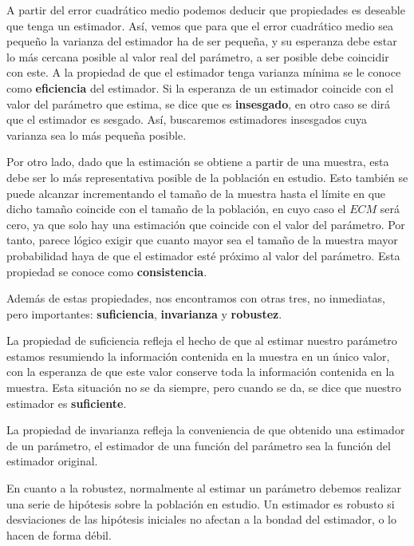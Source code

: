 A partir del error cuadr\'atico medio podemos deducir que propiedades es deseable que tenga un estimador. As\'i, vemos que para que el error cuadr\'atico medio sea peque\~no la varianza del estimador ha de ser peque\~na, y su esperanza debe estar lo m\'as cercana posible al valor real del par\'ametro, a ser posible debe coincidir con este. A la propiedad de que el estimador tenga varianza m\'inima se le conoce como \textbf{eficiencia} del estimador. Si la esperanza de un estimador coincide con el valor del par\'ametro que estima, se dice que es \textbf{insesgado}, en otro caso se dir\'a que el estimador es sesgado. As\'i, buscaremos estimadores insesgados cuya varianza sea lo m\'as peque\~na posible.

Por otro lado, dado que la estimaci\'on se obtiene a partir de una muestra, esta debe ser lo m\'as representativa posible de la poblaci\'on en estudio. Esto tambi\'en se puede alcanzar incrementando el tama\~no de la muestra hasta el l\'imite en que dicho tama\~no coincide con el tama\~no de la poblaci\'on, en cuyo caso el $ECM$ ser\'a cero, ya que solo hay una estimaci\'on que coincide con el valor del par\'ametro. Por tanto, parece l\'ogico exigir que cuanto mayor sea el tama\~no de la muestra mayor probabilidad haya de que el estimador est\'e pr\'oximo al valor del par\'ametro. Esta propiedad se conoce como \textbf{consistencia}.

Adem\'as de estas propiedades, nos encontramos con otras tres, no inmediatas, pero importantes: \textbf{suficiencia}, \textbf{invarianza} y \textbf{robustez}.

La propiedad de suficiencia refleja el hecho de que al estimar nuestro par\'ametro estamos resumiendo la informaci\'on contenida en la muestra en un \'unico valor, con la esperanza de que este valor conserve toda la informaci\'on contenida en la muestra. Esta situaci\'on no se da siempre, pero cuando se da, se dice que nuestro estimador es \textbf{suficiente}.

La propiedad de invarianza refleja la conveniencia de que obtenido una estimador de un par\'ametro, el estimador de una funci\'on del par\'ametro sea la funci\'on del estimador original.

En cuanto a la robustez, normalmente al estimar un par\'ametro debemos realizar una serie de hip\'otesis sobre la poblaci\'on en estudio. Un estimador es robusto si desviaciones de las hip\'otesis iniciales no afectan a la bondad del estimador, o lo hacen de forma d\'ebil.


